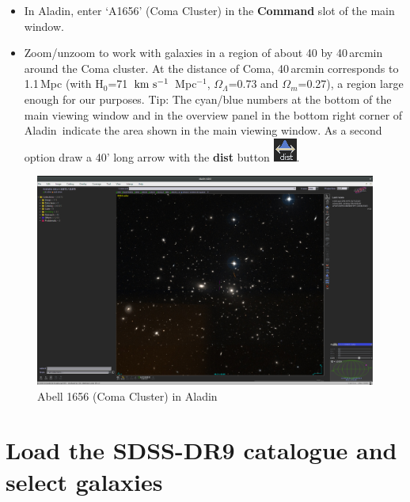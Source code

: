 \documentclass [a4paper, 12pt]{article}
\def\kms{\rm km\ s^{-1}}
\newcommand{\aladin}{{\textsc{A}{ladin}}}
\begin{document}
\begin{itemize}
\item In \aladin, enter `A1656' (Coma Cluster) in the \textbf{Command} slot of 
the main window.
\item Zoom/unzoom to work with galaxies in a region of about 40 by 40\,arcmin 
around the Coma cluster. At the distance of Coma, 40\,arcmin corresponds to 
1.1\,Mpc (with H$_0$=71~$\kms$~Mpc$^{-1}$, $\Omega_\Lambda$=0.73 and 
$\Omega_m$=0.27), a region large enough for our purposes. Tip: 
The cyan/blue numbers at the bottom of the main viewing window and in the 
overview panel in the bottom right corner of \aladin\ indicate the area shown 
in the main viewing window. As a second option draw a 40' long arrow with the 
\textbf{dist} button \includegraphics[width=0.03  
\textwidth]{../images/aladin_button_distance.png}. 
\end{itemize}


\begin{figure}[H]
\center
\includegraphics[width=0.6 \textwidth]{../images/aladin_a1656_new.png}
\caption{Abell 1656 (Coma Cluster) in \aladin}
\label{fig:aladinA1656}
\end{figure}

\section{Load the SDSS-DR9 catalogue and select galaxies}
\end{document}
